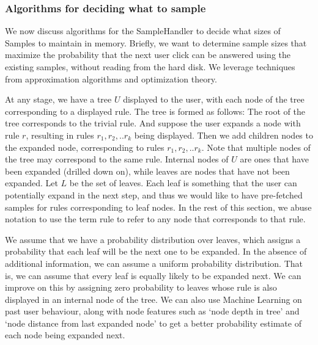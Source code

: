 \subsubsection{Algorithms for deciding what to sample}\label{sec:sampling_algorithms}
We now discuss algorithms for the SampleHandler to decide what sizes of Samples to maintain in memory. Briefly, we want to determine sample sizes that maximize the probability that the next user click can be answered using the existing samples, without reading from the hard disk. We leverage techniques from approximation algorithms and optimization theory.

At any stage, we have a tree $U$ displayed to the user, with each node of the tree corresponding to a displayed rule. The tree is formed as follows: The root of the tree corresponds to the trivial rule. And suppose the user expands a node with rule $r$, resulting in rules $r_1, r_2, .. r_k$ being displayed. Then we add children nodes to the expanded node, corresponding to rules $r_1, r_2, .. r_k$. Note that multiple nodes of the tree may correspond to the same rule. Internal nodes of $U$ are ones that have been expanded (drilled down on), while leaves are nodes that have not been expanded. Let $L$ be the set of leaves. Each leaf is something that the user can potentially expand in the next step, and thus we would like to have pre-fetched samples for rules corresponding to leaf nodes.
In the rest of this section, we abuse notation to use the term rule to refer to any node that corresponds to that rule.

We assume that we have a probability distribution over leaves, which assigns a probability that each leaf will be the next one to be expanded. In the absence of additional information, we can assume a uniform probability distribution. That is, we can assume that every leaf is equally likely to be expanded next. We can improve on this by assigning zero probability to leaves whose rule is also displayed in an internal node of the tree. We can also use Machine Learning on past user behaviour, along with node features such as `node depth in tree' and `node distance from last expanded node' to get a better probability estimate of each node being expanded next. 

